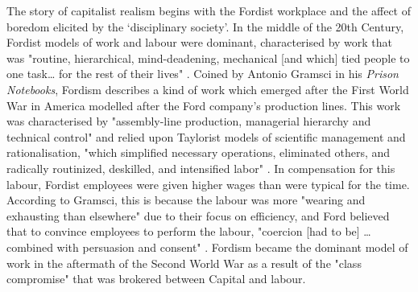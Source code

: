 The story of capitalist realism begins with the Fordist workplace and the affect of boredom elicited by the `disciplinary society'. In the middle of the 20th Century, Fordist models of work and labour were dominant, characterised by work that was "routine, hierarchical, mind-deadening, mechanical [and which] tied people to one task\ldots{} for the rest of their lives" \citep[p. 51]{horgan_lost_2021}. Coined by Antonio Gramsci in his \emph{Prison Notebooks}, Fordism describes a kind of work which emerged after the First World War in America modelled after the Ford company's production lines. This work was characterised by "assembly-line production, managerial hierarchy and technical control" and relied upon Taylorist models of scientific management and rationalisation, "which simplified necessary operations, eliminated others, and radically routinized, deskilled, and intensified labor" \citep[p. 34]{antonio_new_2000}. In compensation for this labour, Fordist employees were given higher wages than were typical for the time. According to Gramsci, this is because the labour was more "wearing and exhausting than elsewhere" \citeyearpar[pp. 311-312]{gramsci_selections_2007} due to their focus on efficiency, and Ford believed that to convince employees to perform the labour, "coercion [had to be] \ldots{} combined with persuasion and consent" \citeyearpar[p. 310]{gramsci_selections_2007}. Fordism became the dominant model of work in the aftermath of the Second World War as a result of the "class compromise" \citep[p. 10]{harvey_brief_2007} that was brokered between Capital and labour. 

